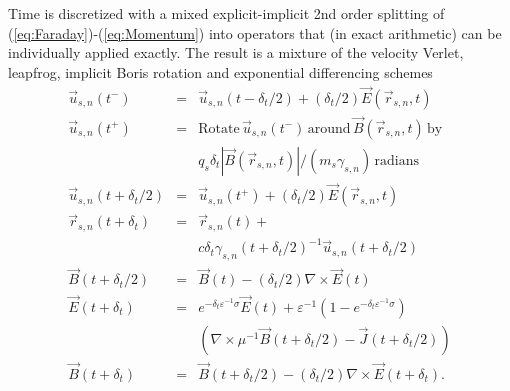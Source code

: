 \documentclass[journal,twoside]{IEEEtran}
\newcommand{\eps}{\varepsilon}
\newcommand{\vecr}{\vec{r}}
\newcommand{\vecu}{\vec{u}}
\newcommand{\vecJ}{\vec{J}}
\newcommand{\vecE}{\vec{E}}
\newcommand{\vecB}{\vec{B}}
\newcommand{\Curl}[1]{\nabla \times #1}
\newcommand{\eq}[1]{(\ref{eq:#1})}
\begin{document}
Time is discretized with a mixed explicit-implicit 2nd order splitting of
\eq{Faraday}-\eq{Momentum} into operators that (in exact arithmetic)
can be individually applied exactly.  The result is a mixture of the
velocity Verlet, leapfrog, implicit Boris rotation and exponential differencing
schemes
\begin{eqnarray*}
\vecu_{s,n}\left(t^-\right) &=&\vecu_{s,n}\left(t-\delta_t/2\right) +
  \left(\delta_t/2\right)\vecE\left(\vecr_{s,n},t\right) \\
\vecu_{s,n}\left(t^+\right) &=&
  \textrm{Rotate}\,\vecu_{s,n}\left(t^-\right)\,\textrm{around}\,
  \vecB\left(\vecr_{s,n},t\right)\,\textrm{by}\\&&
  q_s\delta_t\left|\vecB\left(\vecr_{s,n},t\right)\right| /
  \left(m_s\gamma_{s,n}\right)\,\textrm{radians} \\
\vecu_{s,n}\left(t+\delta_t/2\right) &=&\vecu_{s,n}\left(t^+\right) +
  \left(\delta_t/2\right)\vecE\left(\vecr_{s,n},t\right) \\
\vecr_{s,n}\left(t+\delta_t\right) &=& \vecr_{s,n}\left(t\right) +\\&&
  c\delta_t\gamma_{s,n}\left(t+\delta_t/2\right)^{-1}
           \vecu_{s,n}\left(t+\delta_t/2\right) \\
\vecB\left(t+\delta_t/2\right) &=&
  \vecB\left(t\right) -
  \left(\delta_t/2\right)\Curl{\vecE\left(t\right)} \\
\vecE\left(t+\delta_t\right) &=&
  e^{-\delta_t\eps^{-1}\sigma}\vecE\left(t\right) + 
  \eps^{-1}\left(1-e^{-\delta_t\eps^{-1}\sigma}\right) \\
&&\left( \Curl{\mu^{-1}\vecB\left(t+\delta_t/2\right)} -
         \vecJ\left(t+\delta_t/2\right) \right) \\
\vecB\left(t+\delta_t\right) &=& \vecB\left(t+\delta_t/2\right) -
  \left(\delta_t/2\right)\Curl{\vecE\left(t+\delta_t\right)}
.
\end{eqnarray*}
\end{document}
